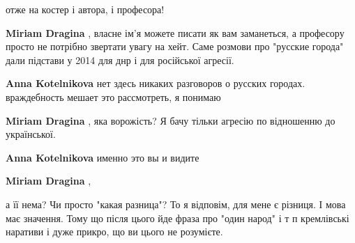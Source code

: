 \begin{itemize}
\begin{itemize}
отже на костер і автора, і професора!

 
\textbf{Miriam Dragina} , власне ім'я можете писати як вам заманеться, а професору просто не потрібно звертати увагу на хейт. Саме розмови про "русские города" дали підстави у 2014 для днр і для російської агресії.

 
\textbf{Anna Kotelnikova} нет здесь никаких разговоров о русских городах. враждебность мешает это рассмотреть, я понимаю

 
\textbf{Miriam Dragina} , яка ворожість? Я бачу тільки агресію по відношенню до української.

 
\textbf{Anna Kotelnikova} именно это вы и видите

 
\textbf{Miriam Dragina} , 

а її нема? Чи просто "какая разница"? То я відповім, для мене є різниця. І мова
має значення. Тому що після цього йде фраза про "один народ" і т п кремлівські
наративи і дуже прикро, що ви цього не розумієте.

 

\end{itemize}
\end{itemize}
